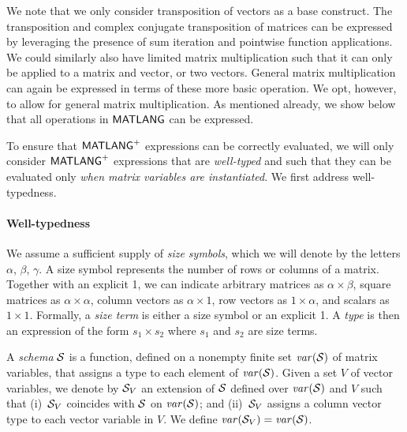 \begin{remark}
We note that we only consider transposition of vectors as a base construct. The transposition and complex conjugate transposition of matrices can be expressed by  leveraging the presence of sum iteration and pointwise function applications.
We could similarly also have limited matrix multiplication such that it can only be applied to a matrix and vector, or two vectors. General matrix multiplication can again be expressed in terms of these more basic operation. We opt, however, to allow for general matrix multiplication. As mentioned already, we show below that all operations in  $\mathsf{MATLANG}$ can be expressed.
\end{remark}

To ensure that $\mathsf{MATLANG}^{\sf +}$ expressions can be correctly evaluated, we will only consider $\mathsf{MATLANG}^{\sf +}$ expressions that are \textit{well-typed} and such that they can be evaluated only \textit{when matrix variables are instantiated}. 
We first address well-typedness.

\paragraph{Well-typedness} We assume a sufficient supply of \textit{size symbols},
which we will denote by the letters $\alpha$, $\beta$, $\gamma$.
A size symbol represents the number of rows or columns of a
matrix.  Together with an explicit 1, we can indicate
arbitrary matrices as $\alpha \times \beta$, square matrices as
$\alpha \times \alpha$, column vectors as $\alpha \times 1$, row
vectors as $1 \times \alpha$, and scalars as $1 \times 1$.
Formally, a \textit{size term} is either a size symbol or an
explicit 1.  A \textit{type} is then an expression of the form $s_1
\times s_2$ where $s_1$ and $s_2$ are size terms.  

A \textit{schema} $\mathcal{S}$ is a function, defined on a nonempty finite
set $\operatorname{\mathit{var}}(\mathcal{S})$ of matrix variables, that assigns a type to each
element of $\operatorname{\mathit{var}}(\mathcal{S})$. Given a set $V$ of vector variables, 
we denote by $\mathcal{S}_V$ an extension of $\mathcal{S}$ defined over $\operatorname{\mathit{var}}(\mathcal{S})$ and $V$
such that (i)~$\mathcal{S}_V$
coincides with $\mathcal{S}$ on $\operatorname{\mathit{var}}(\mathcal{S})$; and (ii)~$\mathcal{S}_V$ assigns 
a column vector type  to each vector variable
in $V$. We define $\operatorname{\mathit{var}}(\mathcal{S}_V)=\operatorname{\mathit{var}}(\mathcal{S})$.

